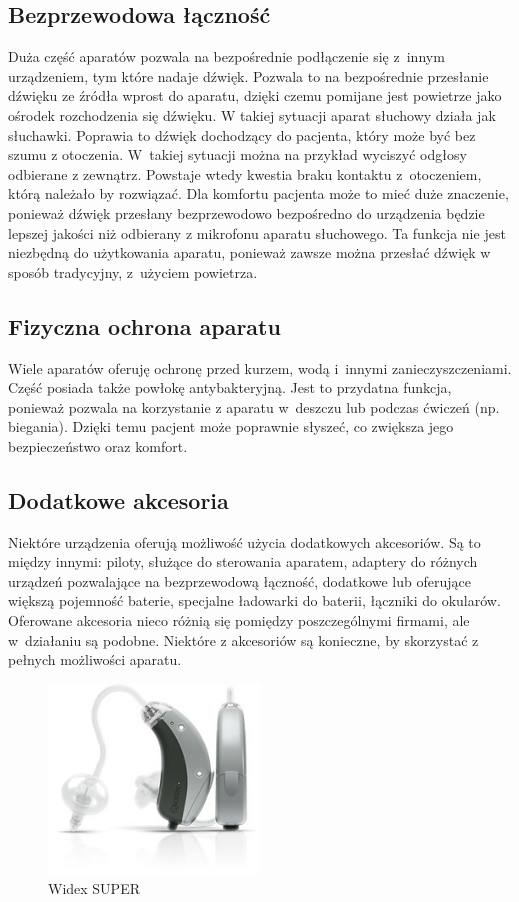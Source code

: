 \documentclass[journal]{IEEEtran}
\begin{document}
\subsection{Bezprzewodowa łączność}

Duża część aparatów pozwala na bezpośrednie podłączenie się z~innym urządzeniem, tym które nadaje dźwięk. Pozwala to na bezpośrednie przesłanie dźwięku ze źródła wprost do aparatu, dzięki czemu pomijane jest powietrze jako ośrodek rozchodzenia się dźwięku. W takiej sytuacji aparat słuchowy działa jak słuchawki. Poprawia to dźwięk dochodzący do pacjenta, który może być bez szumu z otoczenia. W~takiej sytuacji można na przykład wyciszyć odgłosy odbierane z zewnątrz. Powstaje wtedy kwestia braku kontaktu z~otoczeniem, którą należało by rozwiązać. Dla komfortu pacjenta może to mieć duże znaczenie, ponieważ dźwięk przesłany bezprzewodowo bezpośredno do urządzenia będzie lepszej jakości niż odbierany z mikrofonu aparatu słuchowego.
Ta funkcja nie jest niezbędną do użytkowania aparatu, ponieważ zawsze można przesłać dźwięk w sposób tradycyjny, z~użyciem powietrza.

\subsection{Fizyczna ochrona aparatu}

Wiele aparatów oferuję ochronę przed kurzem, wodą i~innymi zanieczyszczeniami. Część posiada także powłokę antybakteryjną. Jest to przydatna funkcja, ponieważ pozwala na korzystanie z aparatu w~deszczu lub podczas ćwiczeń (np. biegania). Dzięki temu pacjent może poprawnie słyszeć, co zwiększa jego bezpieczeństwo oraz komfort.

\subsection{Dodatkowe akcesoria}

Niektóre urządzenia oferują możliwość użycia dodatkowych akcesoriów. Są to między innymi: piloty, służące do sterowania aparatem, adaptery do różnych urządzeń pozwalające na bezprzewodową łączność, dodatkowe lub oferujące większą pojemność baterie, specjalne ładowarki do baterii, łączniki do okularów. Oferowane akcesoria nieco różnią się pomiędzy poszczególnymi firmami, ale w~działaniu są podobne. Niektóre z akcesoriów są konieczne, by skorzystać z pełnych możliwości aparatu.


\begin{figure}
    \includegraphics[width=0.5\textwidth]{widex}
    \caption{Widex SUPER}
    \label{fig:widex}
\end{figure}
\end{document}

